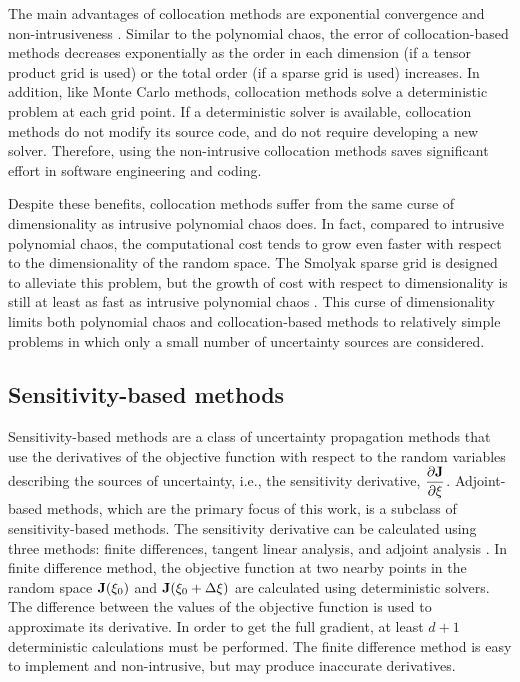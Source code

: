 The main advantages of collocation methods are exponential convergence
and non-intrusiveness \cite[]{collocation1}.
Similar to the polynomial chaos, the error of
collocation-based methods decreases exponentially as the order in
each dimension (if a tensor product grid is used) or the total order (if
a sparse grid is used) increases.  In addition, like Monte Carlo methods,
collocation methods solve a deterministic problem at each grid point.
If a deterministic solver is available, collocation methods do not
modify its source code, and do not require developing a new solver.
Therefore, using the non-intrusive collocation methods saves significant
effort in software engineering and coding.

Despite these benefits,
collocation methods suffer from the same curse of dimensionality as intrusive
polynomial chaos does.  In fact, compared to intrusive polynomial chaos,
the computational cost tends to grow even faster with respect to the
dimensionality of the random space.  The Smolyak sparse grid is designed
to alleviate this problem, but the growth of cost with respect to
dimensionality is still at least as fast as intrusive polynomial chaos
\cite[]{collocation2}.
This curse of dimensionality limits both
polynomial chaos and collocation-based methods to relatively simple problems
in which only a small number of uncertainty sources are considered.

\subsection{Sensitivity-based methods}

Sensitivity-based methods are a class of uncertainty propagation methods that
use the derivatives of the objective function with respect to the random
variables describing the sources of uncertainty,
i.e., the sensitivity derivative, $\dfrac{\partial {\bf J}}{\partial \xi}$.
Adjoint-based methods, which are the primary focus of this work, is a subclass
of sensitivity-based methods.
The sensitivity derivative can be calculated using three
methods: finite differences,
tangent linear analysis, and adjoint analysis \cite[]{dakota}.
In finite difference method,
the objective function at two nearby points in the random space ${\bf J}(\xi_0)$
and ${\bf J}(\xi_0+\Delta \xi)$ are calculated using deterministic solvers.
The difference between the values of the objective function is used to
approximate its derivative.  In order to get the
full gradient, at least $d+1$ deterministic calculations must be performed.
The finite difference method is easy to implement and non-intrusive, but may
produce inaccurate derivatives.


